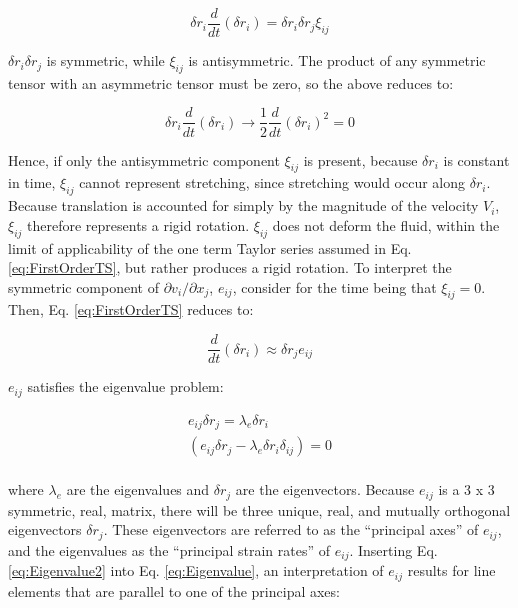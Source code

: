 \documentclass[10pt]{article}
\numberwithin{equation}{section} %
\begin{document}
\begin{equation}
\delta r_i\frac{d}{dt}(\delta r_i)=\delta r_i\delta r_j\xi_{ij}
\end{equation}

\(\delta r_i\delta r_j\) is symmetric, while \(\xi_{ij}\) is antisymmetric. The product of any symmetric tensor with an asymmetric tensor must be zero, so the above reduces to:

\begin{equation}
\delta r_i\frac{d}{dt}(\delta r_i)\rightarrow\frac{1}{2}\frac{d}{dt}\left(\delta r_i\right)^2=0
\end{equation}

Hence, if only the antisymmetric component \(\xi_{ij}\) is present, because \(\delta r_i\) is constant in time, \(\xi_{ij}\) cannot represent stretching, since stretching would occur along \(\delta r_i\). Because translation is accounted for simply by the magnitude of the velocity \(V_i\), \(\xi_{ij}\) therefore represents a rigid rotation. \(\xi_{ij}\) does not deform the fluid, within the limit of applicability of the one term Taylor series assumed in Eq. \eqref{eq:FirstOrderTS}, but rather produces a rigid rotation. To interpret the symmetric component of \(\partial v_i/\partial x_j\), \(e_{ij}\), consider for the time being that \(\xi_{ij}=0\). Then, Eq. \eqref{eq:FirstOrderTS} reduces to:

\begin{equation}
\label{eq:Eigenvalue}
\frac{d}{dt}(\delta r_i)\approx\delta r_je_{ij}
\end{equation}

\(e_{ij}\) satisfies the eigenvalue problem:

\begin{equation}
\label{eq:Eigenvalue2}
\begin{aligned}
e_{ij}\delta r_j=\lambda_e \delta r_i\\
\left(e_{ij}\delta r_j-\lambda_e\delta r_i\delta_{ij}\right)=0\\
\end{aligned}
\end{equation}

where \(\lambda_e\) are the eigenvalues and \(\delta r_j\) are the eigenvectors. Because \(e_{ij}\) is a 3 x 3 symmetric, real, matrix, there will be three unique, real, and mutually orthogonal eigenvectors \(\delta r_j\). These eigenvectors are referred to as the ``principal axes'' of \(e_{ij}\), and the eigenvalues as the ``principal strain rates'' of \(e_{ij}\). Inserting Eq. \eqref{eq:Eigenvalue2} into Eq. \eqref{eq:Eigenvalue}, an interpretation of \(e_{ij}\) results for line elements that are parallel to one of the principal axes:
\end{document}
